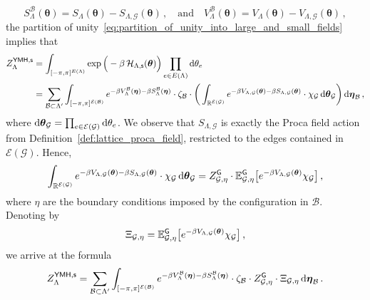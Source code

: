 \documentclass[11pt]{article}
\theoremstyle{definition}
\theoremstyle{remark}
\numberwithin{theorem}{section}
\def\La{{\Lambda}}
\newcommand{\bR}{\mathbb R}
\newcommand{\bE}{\mathbb E}
\newcommand{\cE}{\mathcal{E}}
\newcommand{\cB}{\mathcal B}
\begin{document}
    \begin{equation}\label{eq:action_restricted_to_H}
        S_{\Lambda}^{\mathcal{B}}(\boldsymbol{\theta}) = S_{\Lambda}(\boldsymbol{\theta}) - S_{\Lambda,\mathcal{G}}(\boldsymbol{\theta}) \, , \quad \text{and}\quad V_{\Lambda}^{\mathcal{B}}(\boldsymbol{\theta}) = V_{\Lambda}(\boldsymbol{\theta}) - V_{\Lambda,\mathcal{G}}(\boldsymbol{\theta}) \, ,
    \end{equation}
    the partition of unity~\eqref{eq:partition_of_unity_into_large_and_small_fields} implies that 
    \begin{align*}
          Z_{\Lambda}^{\sf YMH,s} &= \int_{[-\pi,\pi]^{E(\Lambda)}} \exp\Big(-\beta \, \mathcal{H}_{\Lambda,{\sf s}}(\boldsymbol{\theta})\Big) \prod_{e\in E(\Lambda)}  {\rm d}\theta_e   \\ &= \sum_{\cB\subset \La^\prime} \int_{[-\pi,\pi]^{\cE(\cB)}} e^{-\beta V_{\Lambda}^{\mathcal{B}}(\boldsymbol{\eta})- \beta S_{\Lambda}^{\mathcal{B}}(\boldsymbol{\eta})} \cdot \zeta_{\mathcal{B}} \cdot \bigg(\int_{\bR^{\cE (\mathcal{G})}} e^{-\beta V_{\Lambda,\mathcal{G}}(\boldsymbol{\theta})- \beta S_{\Lambda,\mathcal{G}}(\boldsymbol{\theta})} \cdot \chi_{\mathcal{G}} \, {\rm d}\boldsymbol{\theta}_{\mathcal{G}}\bigg) \, {\rm d}\boldsymbol{\eta}_{\mathcal{B}} \, , 
    \end{align*}
    where ${\rm d}\boldsymbol{\theta}_{\mathcal{G}} = \prod_{e\in \cE (\mathcal{G})} {\rm d} \theta_e$. We observe that $S_{\Lambda,\mathcal{G}}$ is exactly the Proca field action from Definition~\ref{def:lattice_proca_field}, restricted to the edges contained in $\cE(\mathcal{G})$. Hence,
    \[
    \int_{\bR^{\cE (\mathcal{G})}} e^{-\beta V_{\Lambda,\mathcal{G}}(\boldsymbol{\theta})- \beta S_{\Lambda,\mathcal{G}}(\boldsymbol{\theta})} \cdot \chi_{\mathcal{G}} \, {\rm d}\boldsymbol{\theta}_{\mathcal{G}} = Z_{\mathcal{G},\eta}^{\sf G} \cdot \bE_{\mathcal{G},\eta}^{\sf G}\big[e^{-\beta V_{\Lambda,\mathcal{G}}(\boldsymbol{\theta})} \chi_{\mathcal{G}}\big] \, , 
    \]
    where $\eta$ are the boundary conditions imposed by the configuration in $\mathcal{B}$. Denoting by
    \begin{equation}
        \label{eq:def_of_Xi_G_eta}
        \Xi_{\mathcal{G},\eta} = \bE_{\mathcal{G},\eta}^{\sf G}\big[e^{-\beta V_{\Lambda,\mathcal{G}}(\boldsymbol{\theta})} \chi_{\mathcal{G}}\big]  \, ,
    \end{equation}
    we arrive at the formula
    \begin{equation}
        \label{eq:YMH_partition_function_first_reduction}
        Z_{\Lambda}^{\sf YMH,s} = \sum_{\mathcal{B}\subset \La^\prime } \int_{[-\pi,\pi]^{\cE(\cB)}} e^{-\beta V_{\Lambda}^{\mathcal{B}}(\boldsymbol{\eta})- \beta S_{\Lambda}^{\mathcal{B}}(\boldsymbol{\eta})} \cdot \zeta_{\mathcal{B}} \cdot Z_{\mathcal{G},\eta}^{\sf G} \cdot \Xi_{\mathcal{G},\eta}\,  {\rm d}\boldsymbol{\eta}_{\mathcal{B}} \, .
    \end{equation}
\end{document}
